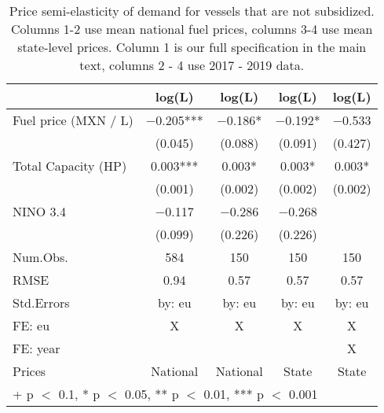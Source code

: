 \begin{table}

\caption{\label{tab:}Price semi-elasticity of demand for vessels that are not subsidized.
             Columns 1-2 use mean national fuel prices, columns 3-4 use mean state-level prices.
             Column 1 is our full specification in the main text, columns 2 - 4 use 2017 - 2019 data.}
\centering
\begin{tabular}[t]{lcccc}
\toprule
  & log(L) & log(L)  & log(L)   & log(L)   \\
\midrule
Fuel price (MXN / L) & \num{-0.205}*** & \num{-0.186}* & \num{-0.192}* & \num{-0.533}\\
 & (\num{0.045}) & (\num{0.088}) & (\num{0.091}) & (\num{0.427})\\
Total Capacity (HP) & \num{0.003}*** & \num{0.003}* & \num{0.003}* & \num{0.003}*\\
 & (\num{0.001}) & (\num{0.002}) & (\num{0.002}) & (\num{0.002})\\
NINO 3.4 & \num{-0.117} & \num{-0.286} & \num{-0.268} & \\
 & (\num{0.099}) & (\num{0.226}) & (\num{0.226}) & \\
\midrule
Num.Obs. & \num{584} & \num{150} & \num{150} & \num{150}\\
RMSE & \num{0.94} & \num{0.57} & \num{0.57} & \num{0.57}\\
Std.Errors & by: eu & by: eu & by: eu & by: eu\\
FE: eu & X & X & X & X\\
FE: year &  &  &  & X\\
Prices & National & National & State & State\\
\bottomrule
\multicolumn{5}{l}{\rule{0pt}{1em}+ p $<$ 0.1, * p $<$ 0.05, ** p $<$ 0.01, *** p $<$ 0.001}\\
\end{tabular}
\end{table}
